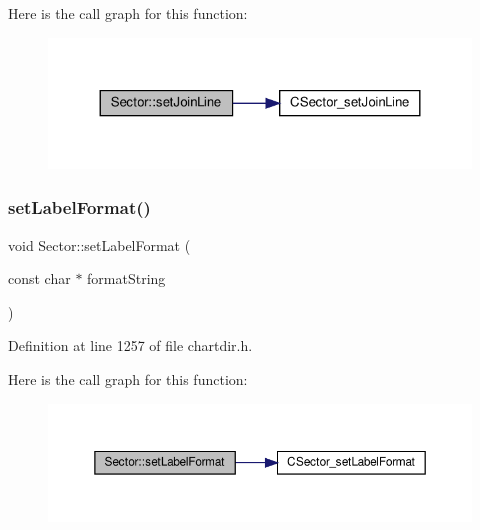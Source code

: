 Here is the call graph for this function\+:
\nopagebreak
\begin{figure}[H]
\begin{center}
\leavevmode
\includegraphics[width=324pt]{class_sector_aec43c56a8b06d90ff6e0b8fa53b057dd_cgraph}
\end{center}
\end{figure}
\mbox{\label{class_sector_a90150f5f741fe157f074703a29554f38}} 
\subsubsection{\texorpdfstring{set\+Label\+Format()}{setLabelFormat()}}
{\footnotesize\ttfamily void Sector\+::set\+Label\+Format (\begin{DoxyParamCaption}\item[{const char $\ast$}]{format\+String }\end{DoxyParamCaption})\hspace{0.3cm}{\ttfamily [inline]}}



Definition at line 1257 of file chartdir.\+h.

Here is the call graph for this function\+:
\nopagebreak
\begin{figure}[H]
\begin{center}
\leavevmode
\includegraphics[width=350pt]{class_sector_a90150f5f741fe157f074703a29554f38_cgraph}
\end{center}
\end{figure}
\mbox{\label{class_sector_a9a658aff9d425de147c28351747468ab}} 
